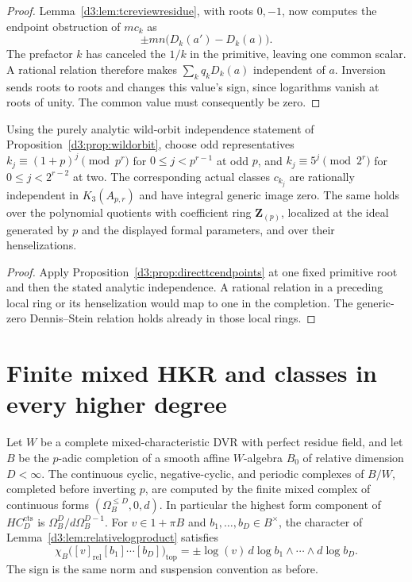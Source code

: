 \begin{proof}
Lemma~\ref{d3:lem:tcreviewresidue}, with roots $0,-1$, now computes the
endpoint obstruction of $mc_k$ as
\[
          \pm mn\bigl(D_k(a')-D_k(a)\bigr).
\]
The prefactor $k$ has canceled the $1/k$ in the primitive, leaving
one common scalar. A rational relation therefore makes
$\sum_kq_kD_k(a)$ independent of $a$. Inversion sends roots to
roots and changes this value's sign, since logarithms vanish at
roots of unity. The common value must consequently be zero.
\end{proof}

\begin{corollary}\label{d3:cor:directtcwildorbit}
Using the purely analytic wild-orbit independence statement of
Proposition~\ref{d3:prop:wildorbit}, choose odd representatives
$k_j\equiv(1+p)^j\pmod{p^r}$ for $0\le j<p^{r-1}$ at odd $p$,
and $k_j\equiv5^j\pmod{2^r}$ for $0\le j<2^{r-2}$ at two.
The corresponding actual classes $c_{k_j}$ are rationally independent
in $K_3(A_{p,r})$ and have integral generic image zero.
The same holds over the polynomial quotients with coefficient ring
$\mathbf Z_{(p)}$, localized at the ideal generated by $p$ and the
displayed formal parameters, and over their henselizations.
\end{corollary}
\begin{proof}
Apply Proposition~\ref{d3:prop:directtcendpoints} at one fixed primitive
root and then the stated analytic independence. A rational relation
in a preceding local ring or its henselization would map to one in
the completion. The generic-zero Dennis--Stein relation holds already
in those local rings.
\end{proof}


\section{Finite mixed HKR and classes in every higher degree}
\label{d3:sec:allhigherdegreelaurent}

\begin{lemma}
\label{d3:lem:finitehkrgeneral}
Let $W$ be a complete mixed-characteristic DVR with perfect residue
field, and let $B$ be the $p$-adic completion of a smooth affine
$W$-algebra $B_0$ of relative dimension $D<\infty$.
The continuous cyclic, negative-cyclic, and periodic complexes of
$B/W$, completed before inverting $p$, are computed by the finite
mixed complex of continuous forms $(\Omega_B^{\leq D},0,d)$.
In particular the highest form component of $HC_D^{\mathrm{cts}}$
is $\Omega_B^D/d\Omega_B^{D-1}$.
For $v\in1+\pi B$ and $b_1,\ldots,b_D\in B^\times$, the character
of Lemma~\ref{d3:lem:relativelogproduct} satisfies
\[
 \chi_B\bigl([v]_{\mathrm{rel}}[b_1]\cdots[b_D]\bigr)_{\mathrm{top}}
 =\pm\log(v)\,d\log b_1\wedge\cdots\wedge d\log b_D.
\]
The sign is the same norm and suspension convention as before.
\end{lemma}

